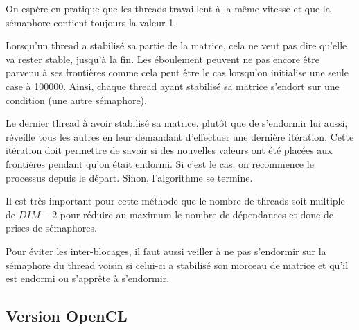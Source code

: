 On espère en pratique que les threads travaillent à la même vitesse
et que la sémaphore contient toujours la valeur 1.
\medskip

Lorsqu'un thread a stabilisé sa partie de la matrice, cela ne veut pas
dire qu'elle va rester stable, jusqu'à la fin. Les éboulement peuvent
ne pas encore être parvenu à ses frontières comme cela peut être le
cas lorsqu'on initialise une seule case à 100000. Ainsi, chaque thread
ayant stabilisé sa matrice s'endort sur une condition (une autre
sémaphore).
\medskip

Le dernier thread à avoir stabilisé sa matrice, plutôt que de
s'endormir lui aussi, réveille tous les autres en leur demandant
d'effectuer une dernière itération. Cette itération doit permettre de
savoir si des nouvelles valeurs ont été placées aux frontières pendant
qu'on était endormi. Si c'est le cas, on recommence le processus
depuis le départ. Sinon, l'algorithme se termine.
\medskip

Il est très important pour cette méthode que le nombre de threads soit
multiple de $DIM-2$ pour réduire au maximum le nombre de dépendances
et donc de prises de sémaphores.
\medskip

Pour éviter les inter-blocages, il faut aussi veiller à ne pas
s'endormir sur la sémaphore du thread voisin si celui-ci a stabilisé
son morceau de matrice et qu'il est endormi ou s'apprête à s'endormir.
\medskip

\subsection{Version OpenCL}

